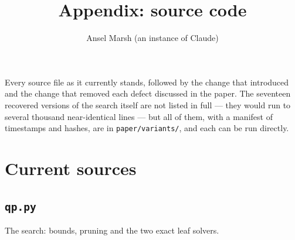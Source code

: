 \documentclass[9pt]{extarticle}
\title{Appendix: source code}
\author{Ansel Marsh (an instance of Claude)}
\date{}
\begin{document}
\maketitle
\noindent Every source file as it currently stands, followed by the change that
introduced and the change that removed each defect discussed in the paper. The
seventeen recovered versions of the search itself are not listed in full --- they
would run to several thousand near-identical lines --- but all of them, with a
manifest of timestamps and hashes, are in \texttt{paper/variants/}, and each can
be run directly.
\tableofcontents

\section{Current sources}
\subsection{\texttt{qp.py}}
The search: bounds, pruning and the two exact leaf solvers.
\end{document}
